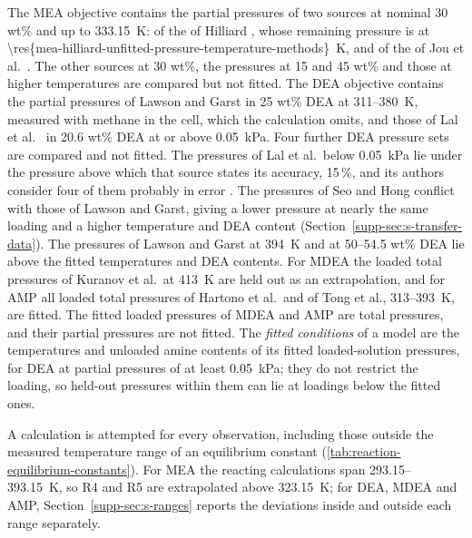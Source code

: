 The MEA objective contains the \COtwo partial pressures of two sources at nominal 30 wt\% and up to \SI{333.15}{\kelvin}:  of the  of Hilliard \cite{Hilliard2008}, whose remaining pressure is at \SI{\res{mea-hilliard-unfitted-pressure-temperature-methods}}{\kelvin}, and  of the  of Jou et al.\ \cite{Jou1995}.
The other sources at 30 wt\%, the pressures at 15 and 45 wt\% and those at higher temperatures are compared but not fitted.
The DEA objective contains the \COtwo partial pressures of Lawson and Garst \cite{lawsonGasSweeteningData1976} in 25 wt\% DEA at 311--\SI{380}{\kelvin}, measured with methane in the cell, which the calculation omits, and those of Lal et al.\ \cite{lalSolubilityH2SCO21985} in 20.6 wt\% DEA at or above \SI{0.05}{\kilo\pascal}.
Four further DEA pressure sets are compared and not fitted.
The pressures of Lal et al.\ below \SI{0.05}{\kilo\pascal} lie under the pressure above which that source states its accuracy, 15\,\%, and its authors consider four of them probably in error \cite{lalSolubilityH2SCO21985}.
The pressures of Seo and Hong \cite{seoSolubilitiesCarbonDioxide1996} conflict with those of Lawson and Garst, giving a lower pressure at nearly the same loading and a higher temperature and DEA content (Section~\ref{supp-sec:s-transfer-data}).
The pressures of Lawson and Garst at \SI{394}{\kelvin} and at 50--54.5 wt\% DEA lie above the fitted temperatures and DEA contents.
For MDEA the loaded total pressures of Kuranov et al.\ at \SI{413}{\kelvin} are held out as an extrapolation, and for AMP all loaded total pressures of Hartono et al.\ and of Tong et al., 313--\SI{393}{\kelvin}, are fitted.
The fitted loaded pressures of MDEA and AMP are total pressures, and their \COtwo partial pressures are not fitted.
The \emph{fitted conditions} of a model are the temperatures and unloaded amine contents of its fitted loaded-solution pressures, for DEA at \COtwo partial pressures of at least \SI{0.05}{\kilo\pascal}; they do not restrict the loading, so held-out pressures within them can lie at loadings below the fitted ones.

A calculation is attempted for every observation, including those outside the measured temperature range of an equilibrium constant (\cref{tab:reaction-equilibrium-constants}).
For MEA the reacting calculations span 293.15--\SI{393.15}{\kelvin}, so R4 and R5 are extrapolated above \SI{323.15}{\kelvin}; for DEA, MDEA and AMP, Section~\ref{supp-sec:s-ranges} reports the deviations inside and outside each range separately.

